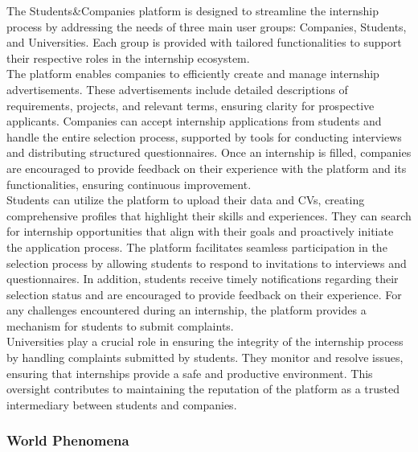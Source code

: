 

The Students\&Companies platform is designed to streamline the internship process by addressing the needs of three main user groups: Companies, Students, and Universities. Each group is provided with tailored functionalities to support their respective roles in the internship ecosystem. \\

The platform enables companies to efficiently create and manage internship advertisements. These advertisements include detailed descriptions of requirements, projects, and relevant terms, ensuring clarity for prospective applicants. Companies can accept internship applications from students and handle the entire selection process, supported by tools for conducting interviews and distributing structured questionnaires. Once an internship is filled, companies are encouraged to provide feedback on their experience with the platform and its functionalities, ensuring continuous improvement. \\

Students can utilize the platform to upload their data and CVs, creating comprehensive profiles that highlight their skills and experiences. They can search for internship opportunities that align with their goals and proactively initiate the application process. The platform facilitates seamless participation in the selection process by allowing students to respond to invitations to interviews and questionnaires. In addition, students receive timely notifications regarding their selection status and are encouraged to provide feedback on their experience. For any challenges encountered during an internship, the platform provides a mechanism for students to submit complaints. \\

Universities play a crucial role in ensuring the integrity of the internship process by handling complaints submitted by students. They monitor and resolve issues, ensuring that internships provide a safe and productive environment. This oversight contributes to maintaining the reputation of the platform as a trusted intermediary between students and companies. 

\subsubsection{World Phenomena}

